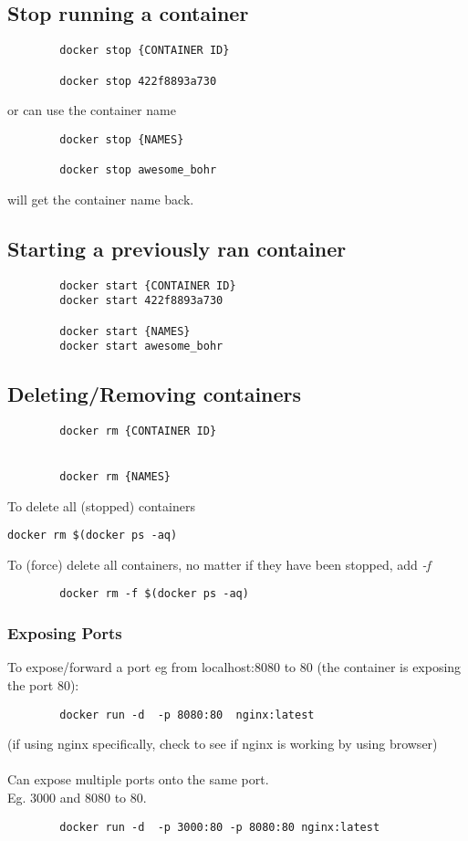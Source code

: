 \subsection{Stop running a container}
\begin{lstlisting}
        docker stop {CONTAINER ID}

        docker stop 422f8893a730
\end{lstlisting}
or can use the container name
\begin{lstlisting}
        docker stop {NAMES}

        docker stop awesome_bohr
\end{lstlisting}
will get the container name back.

\subsection{Starting a previously ran container}
\begin{lstlisting}
        docker start {CONTAINER ID}
        docker start 422f8893a730

        docker start {NAMES}
        docker start awesome_bohr
\end{lstlisting}


\subsection{Deleting/Removing containers}
\begin{lstlisting}
        docker rm {CONTAINER ID}


        docker rm {NAMES}

\end{lstlisting}
To delete all (stopped) containers
\begin{lstlisting}[label={lst:lstlisting3}]
        docker rm $(docker ps -aq)
\end{lstlisting}
To (force) delete all containers, no matter if they have been stopped, add \it{-f}
\begin{lstlisting}
        docker rm -f $(docker ps -aq)
\end{lstlisting}


\subsubsection{Exposing Ports}
To expose/forward a port eg from localhost:8080 to 80 (the container is exposing the port 80):
\begin{lstlisting}
        docker run -d  -p 8080:80  nginx:latest
\end{lstlisting}
(if using nginx specifically, check to see if nginx is working by using browser)
\\\\
Can expose multiple ports onto the same port.\\
Eg. 3000 and 8080 to 80.
\begin{lstlisting}
        docker run -d  -p 3000:80 -p 8080:80 nginx:latest
\end{lstlisting}

